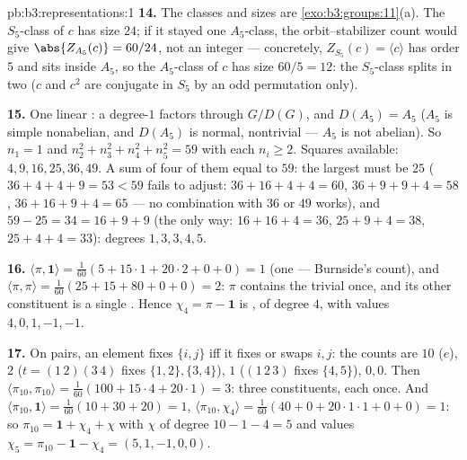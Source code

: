 \begin{solution}{pb:b3:representations:1}
\textbf{14.} The classes and sizes are
\cref{exo:b3:groups:11}(a). The $S_5$-class of $c$ has size
$24$; if it stayed one $A_5$-class, the orbit--stabilizer count
would give $\abs{Z_{A_5}(c)} = 60/24$, not an integer ---
concretely, $Z_{S_5}(c) = \langle c\rangle$ has order $5$ and
sits inside $A_5$, so the $A_5$-class of $c$ has size $60/5 =
12$: the $S_5$-class splits in two ($c$ and $c^2$ are conjugate
in $S_5$ by an odd permutation only).

\textbf{15.} One linear : a degree-$1$ 
factors through $G/D(G)$, and $D(A_5) = A_5$ ($A_5$ is simple
nonabelian, and $D(A_5)$ is normal, nontrivial ---
$A_5$ is not abelian). So $n_1 = 1$ and $n_2^2 + n_3^2 + n_4^2
+ n_5^2 = 59$ with each $n_i \geq 2$. Squares available: $4, 9,
16, 25, 36, 49$. A sum of four of them equal to $59$: the
largest must be $25$ ($36 + 4 + 4 + 9 = 53 < 59$ fails to
adjust: $36 + 16 + 4 + 4 = 60$, $36 + 9 + 9 + 4 = 58$, $36 +
16 + 9 + 4 = 65$ --- no combination with $36$ or $49$ works),
and $59 - 25 = 34 = 16 + 9 + 9$ (the only way: $16 + 16 + 4 =
36$, $25 + 9 + 4 = 38$, $25 + 4 + 4 = 33$): degrees $1, 3, 3,
4, 5$.

\textbf{16.} $\langle\pi, \mathbf 1\rangle = \frac1{60}(5 +
15\cdot1 + 20\cdot2 + 0 + 0) = 1$ (one  --- Burnside's
count), and $\langle\pi, \pi\rangle = \frac1{60}(25 + 15 + 80 +
0 + 0) = 2$: $\pi$ contains the trivial  once, and its
other constituent is a single . Hence $\chi_4 = \pi
- \mathbf 1$ is , of degree $4$, with values $4, 0,
1, -1, -1$.

\textbf{17.} On pairs, an element fixes $\{i,j\}$ iff it fixes
or swaps $i, j$: the counts are $10$ ($e$), $2$ ($t =
(1\,2)(3\,4)$ fixes $\{1,2\}, \{3,4\}$), $1$ ($(1\,2\,3)$
fixes $\{4,5\}$), $0, 0$. Then $\langle\pi_{10},
\pi_{10}\rangle = \frac1{60}(100 + 15\cdot4 + 20\cdot1) = 3$:
three  constituents, each once. And
$\langle\pi_{10}, \mathbf 1\rangle = \frac1{60}(10 + 30 + 20)
= 1$, $\langle\pi_{10}, \chi_4\rangle = \frac1{60}(40 + 0 +
20\cdot1\cdot1 + 0 + 0) = 1$: so $\pi_{10} = \mathbf 1 + \chi_4
+ \chi$ with $\chi$  of degree $10 - 1 - 4 = 5$ and
values $\chi_5 = \pi_{10} - \mathbf 1 - \chi_4 = (5, 1, -1, 0,
0)$.


\end{solution}
